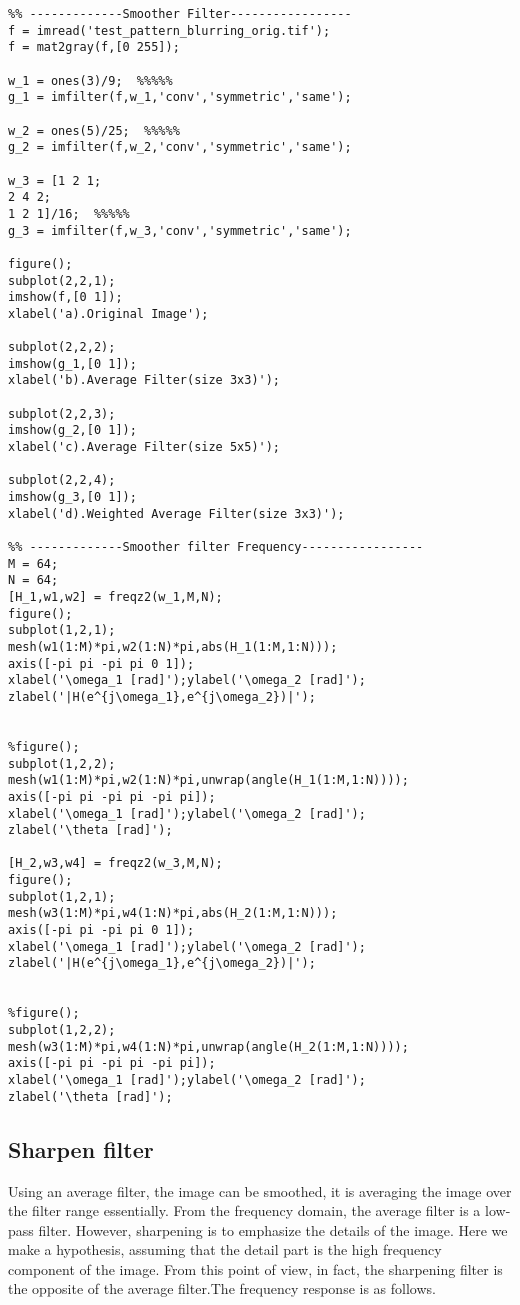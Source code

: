 \documentclass[12pt,a4paper]{article}
\begin{document}
\newpage
\lstset{language=Matlab}
\begin{lstlisting}
%% -------------Smoother Filter-----------------
f = imread('test_pattern_blurring_orig.tif');
f = mat2gray(f,[0 255]);

w_1 = ones(3)/9;  %%%%%
g_1 = imfilter(f,w_1,'conv','symmetric','same');

w_2 = ones(5)/25;  %%%%%
g_2 = imfilter(f,w_2,'conv','symmetric','same');

w_3 = [1 2 1;
2 4 2;
1 2 1]/16;  %%%%%
g_3 = imfilter(f,w_3,'conv','symmetric','same');

figure();
subplot(2,2,1);
imshow(f,[0 1]);
xlabel('a).Original Image');

subplot(2,2,2);
imshow(g_1,[0 1]);
xlabel('b).Average Filter(size 3x3)');

subplot(2,2,3);
imshow(g_2,[0 1]);
xlabel('c).Average Filter(size 5x5)');

subplot(2,2,4);
imshow(g_3,[0 1]);
xlabel('d).Weighted Average Filter(size 3x3)');

%% -------------Smoother filter Frequency-----------------
M = 64;
N = 64;
[H_1,w1,w2] = freqz2(w_1,M,N);
figure();
subplot(1,2,1);
mesh(w1(1:M)*pi,w2(1:N)*pi,abs(H_1(1:M,1:N)));
axis([-pi pi -pi pi 0 1]);
xlabel('\omega_1 [rad]');ylabel('\omega_2 [rad]');
zlabel('|H(e^{j\omega_1},e^{j\omega_2})|');


%figure();
subplot(1,2,2);
mesh(w1(1:M)*pi,w2(1:N)*pi,unwrap(angle(H_1(1:M,1:N))));
axis([-pi pi -pi pi -pi pi]);
xlabel('\omega_1 [rad]');ylabel('\omega_2 [rad]');
zlabel('\theta [rad]');

[H_2,w3,w4] = freqz2(w_3,M,N);
figure();
subplot(1,2,1);
mesh(w3(1:M)*pi,w4(1:N)*pi,abs(H_2(1:M,1:N)));
axis([-pi pi -pi pi 0 1]);
xlabel('\omega_1 [rad]');ylabel('\omega_2 [rad]');
zlabel('|H(e^{j\omega_1},e^{j\omega_2})|');


%figure();
subplot(1,2,2);
mesh(w3(1:M)*pi,w4(1:N)*pi,unwrap(angle(H_2(1:M,1:N))));
axis([-pi pi -pi pi -pi pi]);
xlabel('\omega_1 [rad]');ylabel('\omega_2 [rad]');
zlabel('\theta [rad]');
\end{lstlisting}

\subsection{Sharpen filter}
Using an average filter, the image can be smoothed, it is averaging the image over the filter range  essentially. From the frequency domain, the average filter is a low-pass filter. However, sharpening is to emphasize the details of the image. Here we make a hypothesis, assuming that the detail part is the high frequency component of the image. From this point of view, in fact, the sharpening filter is the opposite of the average filter.The frequency response is as follows.
\end{document}
